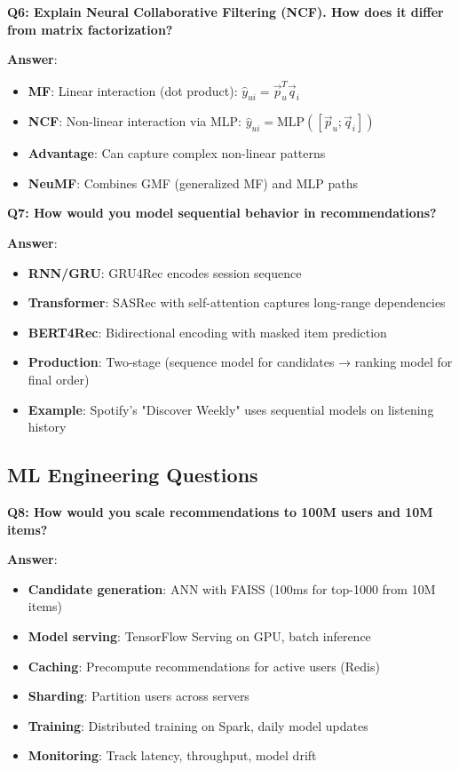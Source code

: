 \documentclass[10pt]{article}
\begin{document}
\textbf{Q6: Explain Neural Collaborative Filtering (NCF). How does it differ from matrix factorization?}

\textbf{Answer}:
\begin{itemize}[leftmargin=*]
    \item \textbf{MF}: Linear interaction (dot product): $\hat{y}_{ui} = \vec{p}_u^T \vec{q}_i$
    \item \textbf{NCF}: Non-linear interaction via MLP: $\hat{y}_{ui} = \text{MLP}([\vec{p}_u; \vec{q}_i])$
    \item \textbf{Advantage}: Can capture complex non-linear patterns
    \item \textbf{NeuMF}: Combines GMF (generalized MF) and MLP paths
\end{itemize}

\textbf{Q7: How would you model sequential behavior in recommendations?}

\textbf{Answer}:
\begin{itemize}[leftmargin=*]
    \item \textbf{RNN/GRU}: GRU4Rec encodes session sequence
    \item \textbf{Transformer}: SASRec with self-attention captures long-range dependencies
    \item \textbf{BERT4Rec}: Bidirectional encoding with masked item prediction
    \item \textbf{Production}: Two-stage (sequence model for candidates → ranking model for final order)
    \item \textbf{Example}: Spotify's "Discover Weekly" uses sequential models on listening history
\end{itemize}

\subsection{ML Engineering Questions}

\textbf{Q8: How would you scale recommendations to 100M users and 10M items?}

\textbf{Answer}:
\begin{itemize}[leftmargin=*]
    \item \textbf{Candidate generation}: ANN with FAISS (100ms for top-1000 from 10M items)
    \item \textbf{Model serving}: TensorFlow Serving on GPU, batch inference
    \item \textbf{Caching}: Precompute recommendations for active users (Redis)
    \item \textbf{Sharding}: Partition users across servers
    \item \textbf{Training}: Distributed training on Spark, daily model updates
    \item \textbf{Monitoring}: Track latency, throughput, model drift
\end{itemize}
\end{document}
